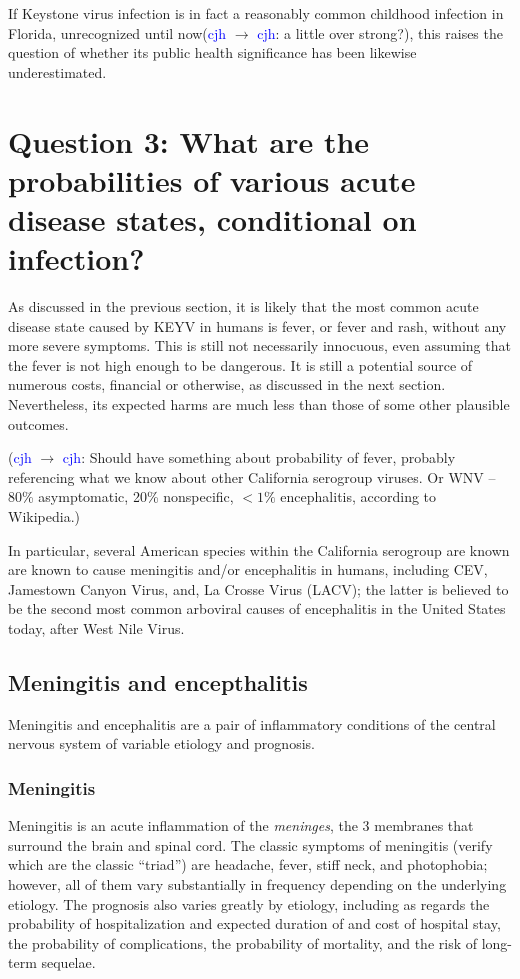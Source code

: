 \documentclass[12pt]{article}
\newcommand{\cjh}{\textcolor{blue}{cjh}}
\newcommand{\msg}[3]{(#1 $\rightarrow$ #2: #3)}
\newcommand{\mcc}[1]{\msg\cjh\cjh{#1}}
\begin{document}
            If Keystone virus infection is in fact a reasonably common childhood infection in Florida, unrecognized until now\mcc{a little over strong?}, this raises the question of whether its public health significance has been likewise underestimated.


    \section[Probabilities of disease, given infection]{Question 3: What are the probabilities of various acute disease states, conditional on infection?}
        \label{probabilities}
        As discussed in the previous section, it is likely that the most common acute disease state caused by KEYV in humans is fever, or fever and rash, without any more severe symptoms. This is still not necessarily innocuous, even assuming that the fever is not high enough to be dangerous. It is still a potential source of numerous costs, financial or otherwise, as discussed in the next section. Nevertheless, its expected harms are much less than those of some other plausible outcomes.

        \mcc{Should have something about probability of fever, probably referencing what we know about other California serogroup viruses. Or WNV -- 80\% asymptomatic, 20\% nonspecific, $<1\%$ encephalitis, according to Wikipedia.}

        In particular, several American species within the California serogroup are known are known to cause meningitis and/or encephalitis in humans, including CEV, Jamestown Canyon Virus, and, La Crosse Virus (LACV); the latter is believed to be the second most common arboviral causes of encephalitis in the United States today, after West Nile Virus.

        \subsection{Meningitis and encepthalitis}
            \label{m-and-e}
            Meningitis and encephalitis are a pair of inflammatory conditions of the central nervous system of variable etiology and prognosis.
            
            \subsubsection{Meningitis}
                \label{meningitis}
            Meningitis is an acute inflammation of the \textit{meninges}, the 3 membranes that surround the brain and spinal cord. The classic symptoms of meningitis (verify which are the classic ``triad'') are headache, fever, stiff neck, and photophobia; however, all of them vary substantially in frequency depending on the underlying etiology. The prognosis also varies greatly by etiology, including as regards the probability of hospitalization and expected duration of and cost of hospital stay, the probability of complications, the probability of mortality, and the risk of long-term sequelae.
\end{document}
